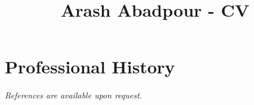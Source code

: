\documentclass[12pt,a4paper]{moderncv}
\title{Arash Abadpour - CV}
\begin{document}
\maketitle







\section{Professional History}












\emph{References are available upon request.}


\end{document}
